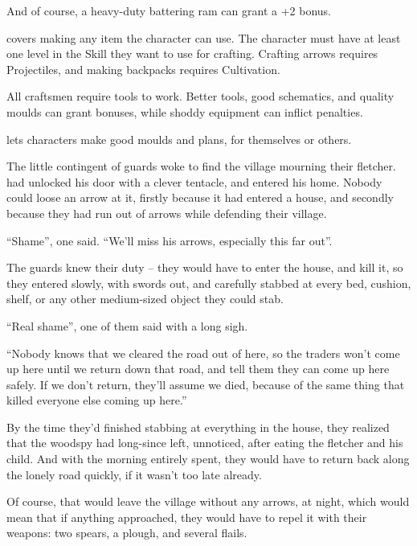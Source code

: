 \begin{multicols}{2}
\begin{description}
    And of course, a heavy-duty battering ram can grant a +2 bonus.
  \item[\roll{Dexterity}{Crafts}]
    covers making any item the character can use.
    The character must have at least one level in the Skill they want to use for crafting.
    Crafting arrows requires Projectiles, and making backpacks requires Cultivation.

    All craftsmen require tools to work.
    Better tools, good schematics, and quality moulds can grant bonuses, while shoddy equipment can inflict penalties.
  \item[\roll{Intelligence}{Crafts}]
    lets characters make good moulds and plans, for themselves or others.
\end{description}

\begin{exampletext}
  The little contingent of \glspl{guard} woke to find the \gls{village} mourning their fletcher.
   had unlocked his door with a clever tentacle, and entered his home.
  Nobody could loose an arrow at it, firstly because it had entered a house, and secondly because they had run out of arrows while defending their \gls{village}.

  ``Shame'', one said.
  ``We'll miss his arrows, especially this far out''.

  The \glspl{guard} knew their duty -- they would have to enter the house, and kill it, so they entered slowly, with swords out, and carefully stabbed at every bed, cushion, shelf, or any other medium-sized object they could stab.

  ``Real shame'', one of them said with a long sigh.

  ``Nobody knows that we cleared the road out of here, so the traders won't come up here until we return down that road, and tell them they can come up here safely.
  If we don't return, they'll assume we died, because of the same thing that killed everyone else coming up here.''

  By the time they'd finished stabbing at everything in the house, they realized that the \gls{woodspy} had long-since left, unnoticed, after eating the fletcher and his child.
  And with the morning entirely spent, they would have to return back along the lonely road quickly, if it wasn't too late already.

  Of course, that would leave the \gls{village} without any arrows, at night, which would mean that if anything approached, they would have to repel it with their weapons: two spears, a plough, and several flails.


\end{exampletext}
\end{multicols}
